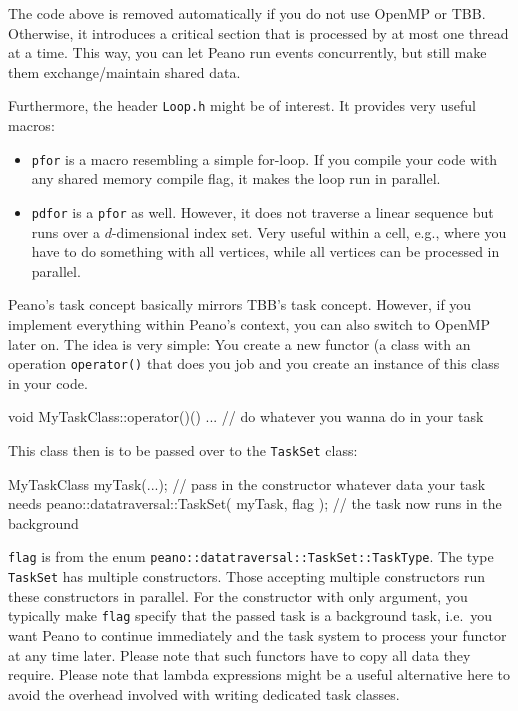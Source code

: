 \noindent
The code above is removed automatically if you do not use OpenMP or TBB.
Otherwise, it introduces a critical section that is processed by at most one
thread at a time.
This way, you can let Peano run events concurrently, but still make them 
exchange/maintain shared data.


Furthermore, the header \texttt{Loop.h} might be of interest. 
It provides very useful macros:
\begin{itemize}
  \item \texttt{pfor} is a macro resembling a simple for-loop. If you compile
  your code with any shared memory compile flag, it makes the loop run in
  parallel.
  \item \texttt{pdfor} is a \texttt{pfor} as well. However, it does not traverse
  a linear sequence but runs over a $d$-dimensional index set. Very useful
  within a cell, e.g., where you have to do something with all vertices, while
  all vertices can be processed in parallel.
\end{itemize}


Peano's task concept basically mirrors TBB's task concept. 
However, if you implement everything within Peano's context, you can also switch
to OpenMP later on.
The idea is very simple: You create a new functor (a class 
with an operation \texttt{operator()} that does you job and
you create an instance of this class in your code.

\begin{code}
  void MyTaskClass::operator()() {
   ...   // do whatever you wanna do in your task 
  } 
\end{code}

\noindent
This class then is to be passed over to the \texttt{TaskSet} class:

\begin{code}
  MyTaskClass myTask(...); // pass in the constructor whatever data your task needs 
  peano::datatraversal::TaskSet( myTask, flag ); // the task now runs in the background
\end{code}

\noindent
\texttt{flag} is from the enum \texttt{peano::datatraversal::TaskSet::TaskType}.
The type \texttt{TaskSet} has multiple constructors. 
Those accepting multiple constructors run these constructors in parallel. 
For the constructor with only argument, you typically make \texttt{flag} specify that 
the passed task is a background task, i.e.~you want Peano to continue immediately 
and the task system to process your functor at any time later. 
Please note that such functors have to copy all data they require.
Please note that lambda expressions might be a useful alternative here to avoid
the overhead involved with writing dedicated task classes.




